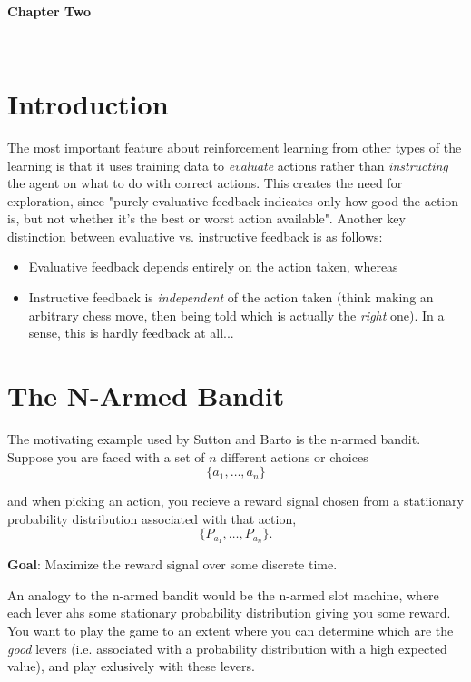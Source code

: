 \documentclass[11pt]{article}
\theoremstyle{definition}
\begin{document}
~
~

\begin{center}
  {
	\fontsize{1.5cm}{1.5cm}
        \textcolor{CalPolyGreen}{\textbf{Chapter Two}}
  }

\end{center}

~
~

\section*{\textcolor{CalPolyGreen}{Introduction}}

The most important feature about reinforcement learning from other types of the learning is that it uses training data to \textit{evaluate} actions rather than \textit{instructing} the agent on what to do with correct actions. This creates the need for exploration, since "purely evaluative feedback indicates only how good the action is, but not whether it's the best or worst action available". Another key distinction between evaluative vs. instructive feedback is as follows:

\begin{itemize}
    \item Evaluative feedback depends entirely on the action taken, whereas
    \item Instructive feedback is \textit{independent} of the action taken (think making an arbitrary chess move, then being told which is actually the \textit{right} one).  In a sense, this is hardly feedback at all...
\end{itemize}

\section*{\textcolor{CalPolyGreen}{The N-Armed Bandit}}

The motivating example used by Sutton and Barto is the n-armed bandit.  Suppose you are faced with a set of $n$ different actions or choices
\begin{equation}
    \{a_1, \dots, a_n\}
\end{equation}

and when picking an action, you recieve a reward signal chosen from a statiionary probability distribution associated with that action,
\[
    \big\{P_{a_1}, \dots, P_{a_n}\big\}.
\]

\textbf{Goal}: Maximize the reward signal over some discrete time.

An analogy to the n-armed bandit would be the n-armed slot machine, where each lever ahs some stationary probability distribution giving you some reward.  You want to play the game to an extent where you can determine which are the \textit{good} levers (i.e. associated with a probability distribution with a high expected value), and play exlusively with these levers.
\end{document}
